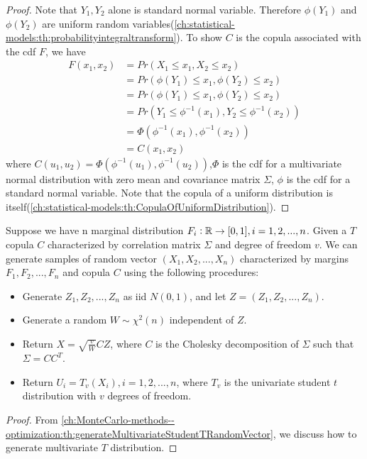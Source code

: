 \begin{refsection}
\begin{lemma}
\end{lemma}
\begin{proof}
	Note that $Y_1,Y_2$ alone is standard normal variable. Therefore $\phi(Y_1)$ and $\phi(Y_2)$ are uniform random variables(\autoref{ch:statistical-models:th:probabilityintegraltransform}). 
	To show $C$ is the copula associated with the cdf $F$, we have
	\begin{align*}
	F(x_1,x_2) &= Pr(X_1\leq x_1, X_2\leq x_2) \\
	&= Pr(\phi(Y_1) \leq x_1, \phi(Y_2) \leq x_2) \\
	&=Pr(\phi(Y_1) \leq x_1, \phi(Y_2) \leq x_2) \\
	&=Pr(Y_1 \leq \phi^{-1}(x_1),Y_2 \leq \phi^{-1}(x_2)) \\
	&=\Phi(\phi^{-1}(x_1),\phi^{-1}(x_2)) \\
	&= C(x_1,x_2)
	\end{align*}
	where $C(u_1,u_2) = \Phi(\phi^{-1}(u_1),\phi^{-1}(u_2))$,$\Phi$ is the cdf for a multivariate normal distribution with zero mean and covariance matrix $\Sigma$, $\phi$ is the cdf for a standard normal variable. Note that the copula of a uniform distribution is itself(\autoref{ch:statistical-models:th:CopulaOfUniformDistribution}).
\end{proof}

\begin{lemma}\cite[420]{roncalli2016lecture}
Suppose we have n marginal distribution $F_i:\mathbb{R}\to [0,1], i=1,2,...,n$. Given a $T$ copula $C$ characterized by correlation matrix  $\Sigma$ and degree of freedom $v$. 	
We can generate samples of random vector $(X_1,X_2, ...,X_n)$ characterized by margins $F_1,F_2,...,F_n$ and copula $C$ using the following procedures:
\begin{itemize}
	\item Generate $Z_1,Z_2,...,Z_n$ as iid $N(0,1)$, and let $Z = (Z_1,Z_2,...,Z_n).$
	\item Generate a random $W\sim \chi^2(n)$ independent of $Z$.
	\item Return $X=\sqrt{\frac{v}{W}}CZ$, where $C$ is the Cholesky decomposition of $\Sigma$ such that $\Sigma = CC^T$.
	\item Return $U_i = T_v(X_i),i=1,2,...,n$, where $T_v$ is the univariate student $t$ distribution with $v$ degrees of freedom.
\end{itemize}	
\end{lemma}
\begin{proof}
From 	
\autoref{ch:MonteCarlo-methods--optimization:th:generateMultivariateStudentTRandomVector}, we discuss how to generate multivariate $T$ distribution.
\end{proof}


\end{refsection}
